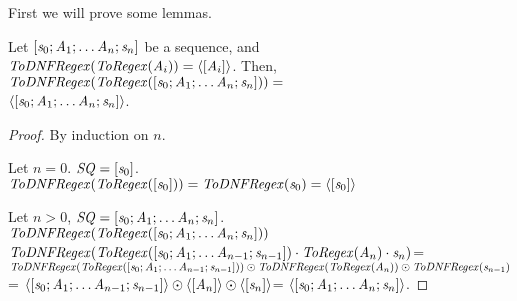 First we will prove some lemmas.
\begin{lemma}
\label{lem:sequence-rx}
Let $[\mathit{s}_0;\mathit{A}_1;
\ldots\mathit{A}_n;\mathit{s}_n]$ be a sequence,
and\\
$\mathit{ToDNFRegex}(\mathit{ToRegex}(\mathit{A}_i))=\langle[\mathit{A}_i]\rangle$.
Then,\\$\mathit{ToDNFRegex}(\mathit{ToRegex}([\mathit{s}_0;\mathit{A}_1;
\ldots\mathit{A}_n;\mathit{s}_n]))=$\\
$\langle[\mathit{s}_0;\mathit{A}_1;
\ldots\mathit{A}_n;\mathit{s}_n]\rangle$.
\end{lemma}
\begin{proof}
By induction on $n$.

Let $n=0$.
$\mathit{SQ}=[\mathit{s}_0]$.\\
$\mathit{ToDNFRegex}(\mathit{ToRegex}([\mathit{s}_0]))=
\mathit{ToDNFRegex}(\mathit{s}_0)=\langle[\mathit{s}_0]\rangle$

Let $n>0$,
$\mathit{SQ}=[\mathit{s}_0;\mathit{A}_1;
\ldots\mathit{A}_n;\mathit{s}_n]$.\\
$\mathit{ToDNFRegex}(\mathit{ToRegex}([\mathit{s}_0;\mathit{A}_1;
\ldots\mathit{A}_n;\mathit{s}_n]))$\\
$\mathit{ToDNFRegex}(\mathit{ToRegex}([\mathit{s}_0;\mathit{A}_1;
\ldots\mathit{A}_{n-1};\mathit{s}_{n-1}])\cdot\mathit{ToRegex}(\mathit{A}_n)
\cdot\mathit{s}_n)$=\\
$\mathit{ToDNFRegex}(\mathit{ToRegex}([\mathit{s}_0;\mathit{A}_1;
\ldots\mathit{A}_{n-1};\mathit{s}_{n-1}]))
\odot\\
\mathit{ToDNFRegex}(\mathit{ToRegex}(\mathit{A}_n))
\odot\\
\mathit{ToDNFRegex}(\mathit{s}_{n-1})$=
$\langle[\mathit{s}_0;\mathit{A}_1;
\ldots\mathit{A}_{n-1};\mathit{s}_{n-1}]\rangle
\odot\\
\langle[\mathit{A}_n]\rangle
\odot
\langle[\mathit{s}_n]\rangle$=
$\langle[\mathit{s}_0;\mathit{A}_1;
\ldots\mathit{A}_n;\mathit{s}_n]\rangle$.
\end{proof}



